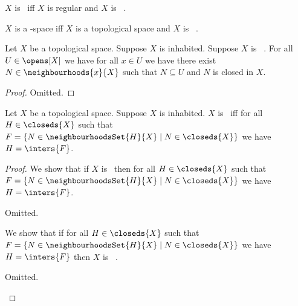 \begin{abbreviation}\label{teethree}
    $X$ is \teethree\ iff $X$ is regular and $X$ is \teezero\ .
\end{abbreviation}

\begin{abbreviation}\label{teethree_space}
    $X$ is a \teethree-space iff $X$ is a topological space and $X$ is \teethree\ .
\end{abbreviation}

\begin{proposition}\label{teethree_implies_closed_neighbourhood_in_open}
    Let $X$ be a topological space.
    Suppose $X$ is inhabited.
    Suppose $X$ is \teethree\ .
    For all $U \in \opens[X]$ we have for all $x \in U$ we have there exist $N \in \neighbourhoods{x}{X}$ such that $N \subseteq U$ and $N$ is closed in $X$.    
\end{proposition}
\begin{proof}
    Omitted.
\end{proof}

\begin{proposition}\label{teethree_iff_each_closed_is_intersection_of_its_closed_neighborhoods}
    Let $X$ be a topological space.
    Suppose $X$ is inhabited.
    $X$ is \teethree\ iff for all $H \in \closeds{X}$ such that $F = \{ N \in \neighbourhoodsSet{H}{X} \mid N \in \closeds{X}\}$ we have $H = \inters{F}$.    
\end{proposition}
\begin{proof}
    We show that if $X$ is \teethree\ then for all $H \in \closeds{X}$ such that $F = \{ N \in \neighbourhoodsSet{H}{X} \mid N \in \closeds{X}\}$ we have $H = \inters{F}$.
    \begin{subproof}
        Omitted.
    \end{subproof}

    We show that if for all $H \in \closeds{X}$ such that $F = \{ N \in \neighbourhoodsSet{H}{X} \mid N \in \closeds{X}\}$ we have $H = \inters{F}$ then $X$ is \teethree\ .
    \begin{subproof}
        Omitted.
    \end{subproof}
\end{proof}


